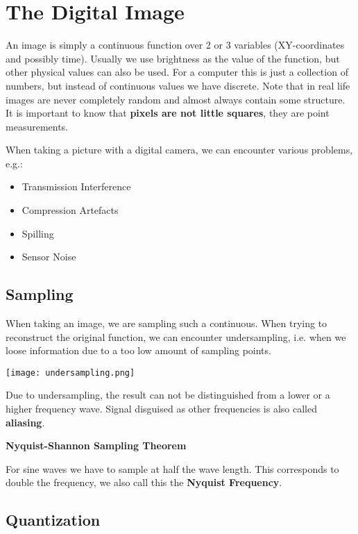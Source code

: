 \section{The Digital Image}

An image is simply a continuous function over 2 or 3 variables (XY-coordinates and possibly time). Usually we use brightness as the value of the function, but other physical values can also be used. For a computer this is just a collection of numbers, but instead of continuous values we have discrete. Note that in real life images are never completely random and almost always contain some structure. It is important to know that \textbf{pixels are not little squares}, they are point measurements.

When taking a picture with a digital camera, we can encounter various problems, e.g.:
\begin{itemize}
	\item Transmission Interference
	\item Compression Artefacts
	\item Spilling
	\item Sensor Noise
\end{itemize}

\subsection{Sampling}

When taking an image, we are sampling such a continuous. When trying to reconstruct the original function, we can encounter undersampling, i.e. when we loose information due to a too low amount of sampling points. 

\begin{center}
	\texttt{[image: undersampling.png]}
\end{center}

Due to undersampling, the result can not be distinguished from a lower or a higher frequency wave. Signal disguised as other frequencies is also called \textbf{aliasing}. \medskip

\textbf{Nyquist-Shannon Sampling Theorem}

For sine waves we have to sample at half the wave length. This corresponds to double the frequency, we also call this the \textbf{Nyquist Frequency}.

\subsection{Quantization}

